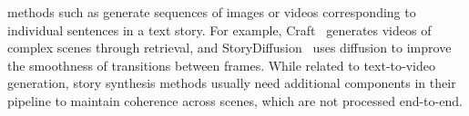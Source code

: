  methods such as \cite{li2019storygan,huang2016visual,pan2024synthesizing,maharana2022storydalle,rahman2023makeastory,liu2024storysalon} generate sequences of images or videos corresponding to individual sentences in a text story. 
For example, Craft~\cite{gupta2018flintstones} generates videos of complex scenes through retrieval, and StoryDiffusion~\cite{zhou2024storydiffusion} uses diffusion to improve the smoothness of transitions between frames. 
While related to text-to-video generation, story synthesis methods usually need additional components in their pipeline to maintain coherence across scenes, which are not processed end-to-end.
